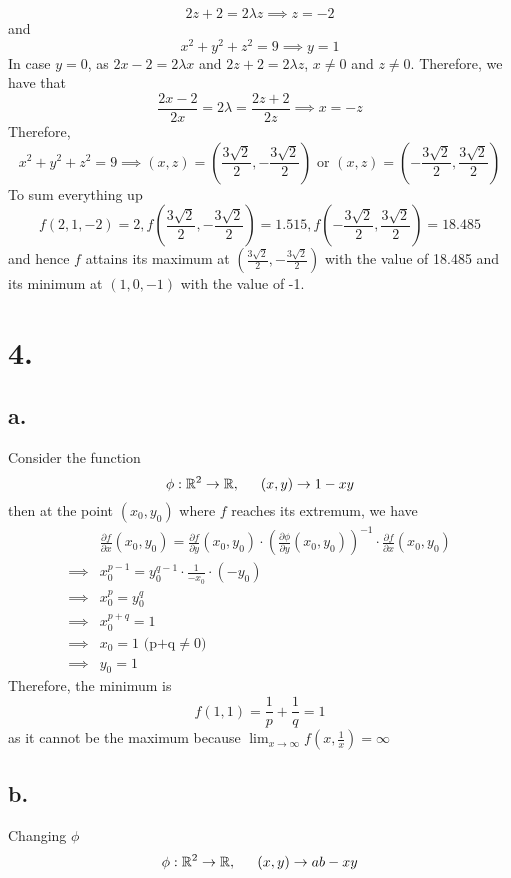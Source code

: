 \documentclass[11pt]{article}
\begin{document}
\[
    2z+2 = 2\lambda z \implies z = -2
\]
and 
\[
    x^2+y^2+z^2 = 9 \implies y = 1
\]
In case $y=0$, as $2x-2=2\lambda x$ and $2z+2 = 2\lambda z$, $x\ne 0$ and $z\ne 0$. Therefore, we have that
\[
    \frac{2x-2}{2x} = 2\lambda = \frac{2z+2}{2z} \implies x = -z    
\]
Therefore, 
\[
    x^2+y^2+z^2=9 \implies (x,z) = \left(\frac{3\sqrt{2}}{2},-\frac{3\sqrt{2}}{2}\right) \text{ or } (x,z) = \left(-\frac{3\sqrt{2}}{2},\frac{3\sqrt{2}}{2}\right)    
\]
To sum everything up 
\[
    f(2,1,-2) = 2, f\left(\frac{3\sqrt{2}}{2},-\frac{3\sqrt{2}}{2}\right) = 1.515, f\left(-\frac{3\sqrt{2}}{2},\frac{3\sqrt{2}}{2}\right) = 18.485 
\]
and hence $f$ attains its maximum at $\left(\frac{3\sqrt{2}}{2},-\frac{3\sqrt{2}}{2}\right)$ with the value of 18.485
and its minimum at $(1,0,-1)$ with the value of -1.
\pagebreak
\section*{4.}
\subsection*{a.}
Consider the function
\[
    \phi: \mathbb{R}^2 \to \mathbb{R}, \indent (x,y) \to 1-xy    
\]
then at the point $(x_0, y_0)$ where $f$ reaches its extremum, we have
\begin{equation*}
    \begin{aligned}
        &\frac{\partial f}{\partial x}(x_0,y_0) = \frac{\partial f}{\partial y} (x_0,y_0) \cdot \left( \frac{\partial \phi}{\partial y}(x_0,y_0) \right)^{-1} \cdot \frac{\partial f}{ \partial x} (x_0,y_0) \\  
        \implies & x_0^{p-1} = y_0^{q-1} \cdot \frac{1}{-x_0} \cdot (-y_0) \\ 
        \implies & x_0^p = y_0^q \\
        \implies & x_0^{p+q} = 1 \\
        \implies & x_0 = 1 \text{ (p+q} \ne 0) \\
        \implies & y_0 = 1
    \end{aligned}
\end{equation*}
Therefore, the minimum is 
\[
    f(1,1) = \frac{1}{p}+ \frac{1}{q} = 1
\]
as it cannot be the maximum because $\lim_{x \to \infty} f(x,\frac{1}{x}) = \infty $
\subsection*{b.}
Changing $\phi$ 
\[
    \phi: \mathbb{R}^2 \to \mathbb{R}, \indent (x,y) \to ab-xy    
\]
\end{document}

